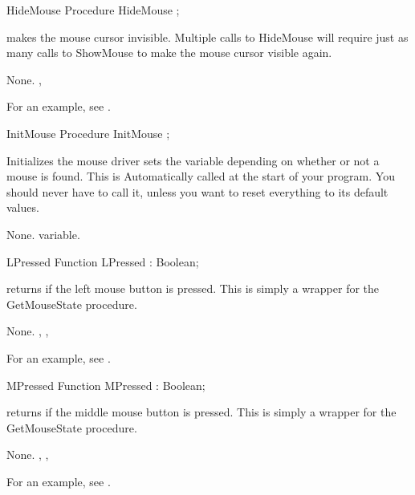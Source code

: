 
\begin{procedure}{HideMouse}
\Declaration
Procedure HideMouse ;

\Description

 makes the mouse cursor invisible.
Multiple calls to HideMouse will require just as many calls to ShowMouse to
make the mouse cursor visible again.

\Errors
None.
\SeeAlso
{}, 
\end{procedure}
For an example, see .
\begin{procedure}{InitMouse}
\Declaration
Procedure InitMouse ;

\Description

Initializes the mouse driver sets the variable  depending on
whether or not a mouse is found.
This is Automatically called at the start of your program. 
You should never have to call it, unless you want to reset everything to 
its default values.

\Errors
None.
\SeeAlso
{} variable.
\end{procedure}


\begin{function}{LPressed}
\Declaration
Function LPressed  : Boolean;

\Description

 returns  if the left mouse button is pressed.
This is simply a wrapper for the GetMouseState procedure.

\Errors
None.
\SeeAlso
{}, , 
\end{function}

For an example, see .

\begin{function}{MPressed}
\Declaration
Function MPressed  : Boolean;

\Description

 returns  if the middle mouse button is pressed.
This is simply a wrapper for the GetMouseState procedure.

\Errors
None.
\SeeAlso
{}, , 
\end{function}

For an example, see .

